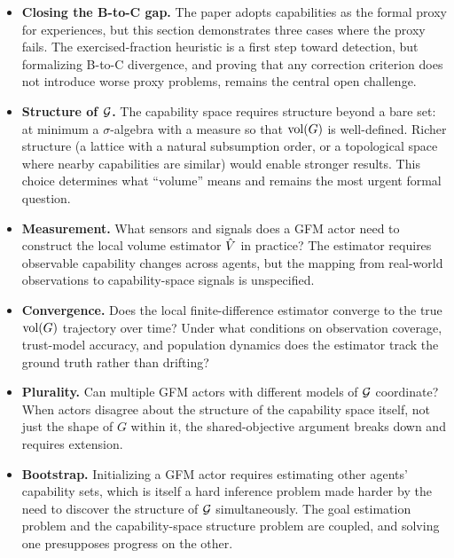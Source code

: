 \begin{itemize}
    \item \textbf{Closing the B-to-C gap.} The paper adopts capabilities as the formal proxy for experiences, but this section demonstrates three cases where the proxy fails. The exercised-fraction heuristic is a first step toward detection, but formalizing B-to-C divergence, and proving that any correction criterion does not introduce worse proxy problems, remains the central open challenge.

    \item \textbf{Structure of $\mathcal{G}$.} The capability space requires structure beyond a bare set: at minimum a $\sigma$-algebra with a measure so that $\operatorname{vol}(G)$ is well-defined. Richer structure (a lattice with a natural subsumption order, or a topological space where nearby capabilities are similar) would enable stronger results. This choice determines what ``volume'' means and remains the most urgent formal question.

    \item \textbf{Measurement.} What sensors and signals does a GFM actor need to construct the local volume estimator $\hat{V}$ in practice? The estimator requires observable capability changes across agents, but the mapping from real-world observations to capability-space signals is unspecified.

    \item \textbf{Convergence.} Does the local finite-difference estimator converge to the true $\operatorname{vol}(G)$ trajectory over time? Under what conditions on observation coverage, trust-model accuracy, and population dynamics does the estimator track the ground truth rather than drifting?

    \item \textbf{Plurality.} Can multiple GFM actors with different models of $\mathcal{G}$ coordinate? When actors disagree about the structure of the capability space itself, not just the shape of $G$ within it, the shared-objective argument breaks down and requires extension.

    \item \textbf{Bootstrap.} Initializing a GFM actor requires estimating other agents' capability sets, which is itself a hard inference problem made harder by the need to discover the structure of $\mathcal{G}$ simultaneously. The goal estimation problem and the capability-space structure problem are coupled, and solving one presupposes progress on the other.
\end{itemize}
